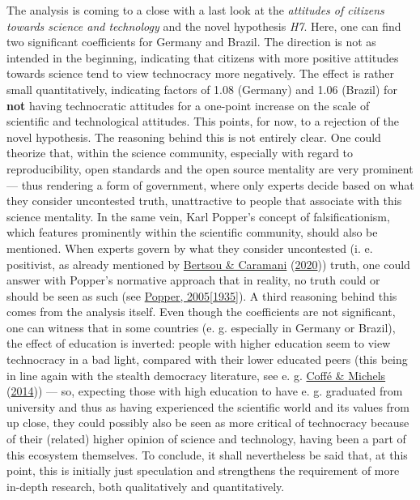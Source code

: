 \documentclass[
  12pt,
  english,
]{article}
\begin{document}
The analysis is coming to a close with a last look at the
\emph{attitudes of citizens towards science and technology} and the
novel hypothesis \emph{H7}. Here, one can find two significant
coefficients for Germany and Brazil. The direction is not as intended in
the beginning, indicating that citizens with more positive attitudes
towards science tend to view technocracy more negatively. The effect is
rather small quantitatively, indicating factors of 1.08 (Germany) and
1.06 (Brazil) for \textbf{not} having technocratic attitudes for a
one-point increase on the scale of scientific and technological
attitudes. This points, for now, to a rejection of the novel hypothesis.
The reasoning behind this is not entirely clear. One could theorize
that, within the science community, especially with regard to
reproducibility, open standards and the open source mentality are very
prominent --- thus rendering a form of government, where only experts
decide based on what they consider uncontested truth, unattractive to
people that associate with this science mentality. In the same vein,
Karl Popper's concept of falsificationism, which features prominently
within the scientific community, should also be mentioned. When experts
govern by what they consider uncontested (i. e. positivist, as already
mentioned by \protect\hyperlink{ref-bertsou2020measuring}{Bertsou \&
Caramani} (\protect\hyperlink{ref-bertsou2020measuring}{2020})) truth,
one could answer with Popper's normative approach that in reality, no
truth could or should be seen as such (see
\protect\hyperlink{ref-popper1935logik}{Popper, 2005{[}1935{]}}). A
third reasoning behind this comes from the analysis itself. Even though
the coefficients are not significant, one can witness that in some
countries (e. g. especially in Germany or Brazil), the effect of
education is inverted: people with higher education seem to view
technocracy in a bad light, compared with their lower educated peers
(this being in line again with the stealth democracy literature, see e.
g. \protect\hyperlink{ref-coffe2014education}{Coffé \& Michels}
(\protect\hyperlink{ref-coffe2014education}{2014})) --- so, expecting
those with high education to have e. g. graduated from university and
thus as having experienced the scientific world and its values from up
close, they could possibly also be seen as more critical of technocracy
because of their (related) higher opinion of science and technology,
having been a part of this ecosystem themselves. To conclude, it shall
nevertheless be said that, at this point, this is initially just
speculation and strengthens the requirement of more in-depth research,
both qualitatively and quantitatively.
\end{document}
